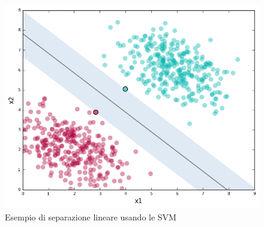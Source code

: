 \begin{figure}
    \centering
    \includegraphics[width=\textwidth]{immagini/svm.png}
    \caption{Esempio di separazione lineare usando le SVM}
    \label{fig:svm}
\end{figure}

